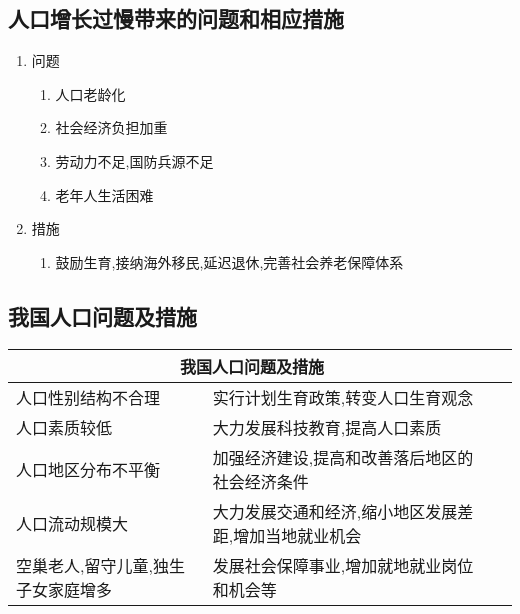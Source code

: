 \documentclass[a4paper]{article}
\begin{document}
    \subsection{人口增长过慢带来的问题和相应措施}
    \begin{enumerate}
        \item 问题
        \begin{enumerate}
            \item 人口老龄化
            \item 社会经济负担加重
            \item 劳动力不足,国防兵源不足
            \item 老年人生活困难
        \end{enumerate}
        \item 措施
        \begin{enumerate}
            \item 鼓励生育,接纳海外移民,延迟退休,完善社会养老保障体系
        \end{enumerate}
    \end{enumerate}
    \subsection{我国人口问题及措施}
    \begin{table}[h]
        \begin{tabular}{|p{35mm}|l|l|}
            \hline
            \multicolumn{2}{c}{我国人口问题及措施} \\
            \hline
            人口性别结构不合理 & 实行计划生育政策,转变人口生育观念 \\
            \hline
            人口素质较低 & 大力发展科技教育,提高人口素质 \\
            \hline
            人口地区分布不平衡 & 加强经济建设,提高和改善落后地区的社会经济条件 \\
            \hline
            人口流动规模大 & 大力发展交通和经济,缩小地区发展差距,增加当地就业机会 \\
            \hline
            空巢老人,留守儿童,独生子女家庭增多 & 发展社会保障事业,增加就地就业岗位和机会等 \\
            \hline
        \end{tabular}
    \end{table}
\end{document}
